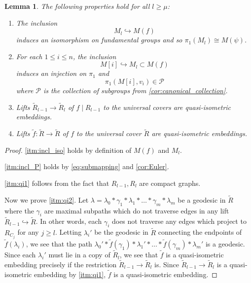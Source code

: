 \documentclass[11pt, a4paper]{amsart}
\newtheorem{lemma}[theorem]{Lemma}
\theoremstyle{definition}
\newcommand{\wt}[1]{\widetilde{ #1 }}
\def\injects{\hookrightarrow}
\begin{document}
\begin{lemma}
\label{lem:submapping_torus}
The following properties hold for all $l\geqslant \mu$:
\begin{enumerate}
\item\label{itm:incl_iso} The inclusion
\[
M_{l} \injects M(f)
\]
induces an isomorphism on fundamental groups and so $\pi_1(M_l) \cong M(\psi)$.
\item\label{itm:incl_P} For each $1\leqslant i\leqslant n$, the inclusion
\[
M[i]\injects M_l \subset M(f)
\]
induces an injection on $\pi_1$ and
\[
\pi_1(M[i], v_i)\in \mathcal{P}
\]
where $\mathcal{P}$ is the collection of subgroups from \cref{cor:canonical_collection}.
\item\label{itm:qi1} Lifts $\wt{R}_{l-1}\to \wt{R}_{l}$ of $f\mid R_{l-1}$ to the universal covers are quasi-isometric embeddings.
\item\label{itm:qi2} Lifts $\wt{f}\colon \wt{R}\to\wt{R}$ of $f$ to the universal cover $\wt{R}$ are quasi-isometric embeddings.
\end{enumerate}
\end{lemma}

\begin{proof}
\cref{itm:incl_iso} holds by definition of $M(f)$ and $M_l$.

\cref{itm:incl_P} holds by \eqref{eq:submapping} and \cref{cor:Euler}.

\cref{itm:qi1} follows from the fact that $R_{l-1}, R_{l}$ are compact graphs.

Now we prove \cref{itm:qi2}. Let $\lambda = \lambda_0*\gamma_1*\lambda_1*\ldots*\gamma_m*\lambda_m$ be a geodesic in $\widetilde{R}$ where the $\gamma_i$ are maximal subpaths which do not traverse edges in any lift $\widetilde{R}_{l-1}\injects \widetilde{R}$. In other words, each $\gamma_i$ does not traverse any edges which project to $R_{C_j}$ for any $j\geqslant l$. Letting $\lambda_i'$ be the geodesic in $\widetilde{R}$ connecting the endpoints of $\widetilde{f}(\lambda_i)$, we see that the path $\lambda_0'*\widetilde{f}(\gamma_1)*\lambda_1'*\ldots*\widetilde{f}(\gamma_m)*\lambda_m'$ is a geodesic. Since each $\lambda_i'$ must lie in a copy of $\widetilde{R}_{l}$, we see that $\widetilde{f}$ is a quasi-isometric embedding precisely if the restriction $\widetilde{R}_{l-1}\to \widetilde{R}_{l}$ is. Since $\widetilde{R}_{l-1}\to \widetilde{R}_{l}$ is a quasi-isometric embedding by \cref{itm:qi1}, $\widetilde{f}$ is a quasi-isometric embedding.
\end{proof}
\end{document}
